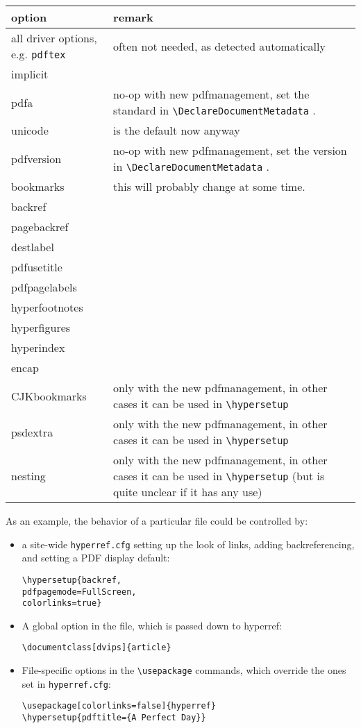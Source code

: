 \documentclass{article}
\newcommand*{\cs}[1]{%
  \texttt{\textbackslash #1}%
}
\begin{document}
\begin{tabular}{>{\ttfamily}l>{\raggedright\arraybackslash}p{5cm}}
option     & remark \\\hline
all driver options, e.g. \texttt{pdftex} & often not needed, as detected automatically\\
implicit   \\
pdfa       & no-op with new pdfmanagement, set the standard in \cs{DeclareDocumentMetadata}.\\
unicode    & is the default now anyway\\
pdfversion & no-op with new pdfmanagement, set the version in \cs{DeclareDocumentMetadata}.\\
bookmarks  & this will probably change at some time. \\
backref &\\
pagebackref & \\
destlabel  &\\
pdfusetitle &\\
pdfpagelabels &\\
hyperfootnotes &\\
hyperfigures&\\
hyperindex &\\
encap &\\
CJKbookmarks & only with the new pdfmanagement, in other cases it can be used in \cs{hypersetup}\\
psdextra     & only with the new pdfmanagement, in other cases it can be used in \cs{hypersetup}\\
nesting      & only with the new pdfmanagement, in other cases it can be used in \cs{hypersetup} (but
               is quite unclear if it has any use)\\

\end{tabular}

As an example, the behavior of a particular file could be controlled by:
\begin{itemize}

\item	a site-wide \texttt{hyperref.cfg} setting up the look of links,
adding backreferencing, and setting a PDF display default:

\begin{verbatim}
\hypersetup{backref,
pdfpagemode=FullScreen,
colorlinks=true}
\end{verbatim}

\item	A global option in the file, which is passed down to
\textsf{hyperref}:

\begin{verbatim}
\documentclass[dvips]{article}
\end{verbatim}

\item	File-specific options in the \cs{usepackage} commands, which
override the ones set in \texttt{hyperref.cfg}:

\begin{verbatim}
\usepackage[colorlinks=false]{hyperref}
\hypersetup{pdftitle={A Perfect Day}}
\end{verbatim}
\end{itemize}
\end{document}

